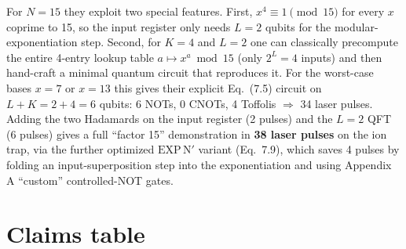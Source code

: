 \documentclass[11pt]{article}
\begin{document}
For $N=15$ they exploit two special features. First, $x^4 \equiv 1 \pmod{15}$
for every $x$ coprime to 15, so the input register only needs $L=2$ qubits for
the modular-exponentiation step. Second, for $K=4$ and $L=2$ one can classically
precompute the entire 4-entry lookup table $a \mapsto x^a \bmod 15$ (only $2^L=4$
inputs) and then hand-craft a minimal quantum circuit that reproduces it.
For the worst-case bases $x=7$ or $x=13$ this gives their explicit Eq.~(7.5)
circuit on $L+K = 2+4 = 6$ qubits: 6 NOTs, 0 CNOTs, 4 Toffolis
$\Rightarrow$ 34 laser pulses. Adding the two Hadamards on the input
register (2 pulses) and the $L=2$ QFT (6 pulses) gives a full ``factor 15''
demonstration in \textbf{38 laser pulses} on the ion trap, via the further
optimized $\mathrm{EXP\,N}'$ variant (Eq.~7.9), which saves 4 pulses by
folding an input-superposition step into the exponentiation and using
Appendix A ``custom'' controlled-NOT gates.

\section{Claims table}
\end{document}
